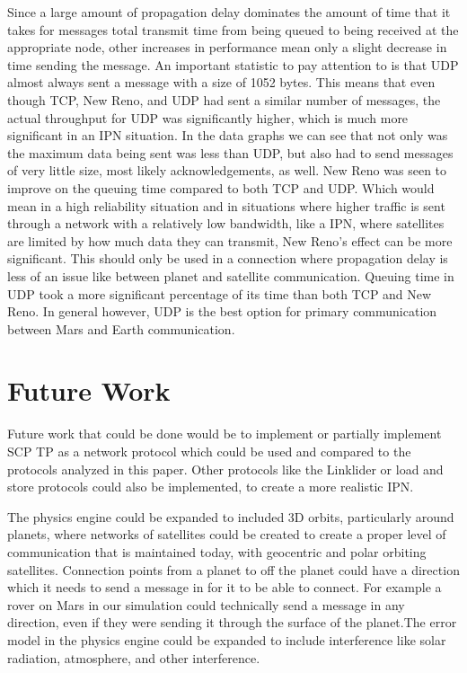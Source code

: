 \documentclass[a4paper,12pt]{article}
\begin{document}
Since a large amount of propagation delay dominates the amount of time that it takes for messages total 
transmit time from being queued to being received at the appropriate node, other increases in performance 
mean only a slight decrease in time sending the message. An important statistic to pay attention to is that 
UDP almost always sent a message with a size of 1052 bytes. This means that even though TCP, New Reno, and 
UDP had sent a similar number of messages, the actual throughput for UDP was significantly higher, which 
is much more significant in an IPN situation. In the data graphs we can see that not only was the maximum 
data being sent was less than UDP, but also had to send messages of very little size, most likely acknowledgements,
as well. New Reno was seen to improve on the queuing time compared to both TCP and UDP. Which would mean in a 
high reliability situation and in situations where higher traffic is sent through a network with a relatively low 
bandwidth, like a IPN, where satellites are limited by how much data they can transmit, New Reno's effect can be 
more significant. This should only be used in a connection where propagation delay is less of an issue like 
between planet and satellite communication. Queuing time in UDP took a more significant percentage of its 
time than both TCP and New Reno. In general however, UDP is the best option for primary communication between 
Mars and Earth communication. 

\section{Future Work}

Future work that could be done would be to implement or partially implement SCP TP as a network 
protocol which could be used and compared to the protocols analyzed in this paper. Other protocols 
like the Linklider or load and store protocols could also be implemented, to create a more realistic 
IPN. 

The physics engine could be expanded to included 3D orbits, particularly around planets, where networks of 
satellites could be created to create a proper level of communication that is maintained today, with geocentric 
and polar orbiting satellites. Connection points from a planet to off the planet could have a direction which it 
needs to send a message in for it to be able to connect. For example a rover on Mars in our simulation could technically 
send a message in any direction, even if they were sending it through the surface of the planet.The error model in 
the physics engine could be expanded to include interference like solar radiation, atmosphere, and other interference. 
\end{document}
